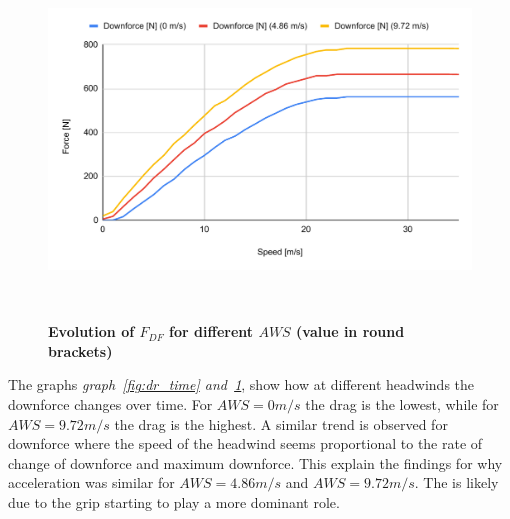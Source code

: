 \documentclass[11pt, a4paper]{article}
\begin{document}
\begin{figure}[H]
    \centering
    \caption{\textbf{Evolution of $F_{DF}$ for different $AWS$ (value in round brackets)}}
    \includegraphics[width=\textwidth]{images/df_time.pdf}
    
~\label{fig:df_time}
\end{figure}
The graphs \textit{{graph~\ref{fig:dr_time} and~\ref{fig:df_time}}}, show how at different headwinds the downforce changes over time. For $AWS=0m/s$ the drag is the lowest, while for $AWS=9.72m/s$ the drag is the highest.
A similar trend is observed for downforce where the speed of the headwind seems proportional to the rate of change of downforce and maximum downforce.
This explain the findings for why acceleration was similar for $AWS=4.86m/s$ and $AWS=9.72m/s$. The is likely due to the grip starting to play a more dominant role. 
\end{document}
